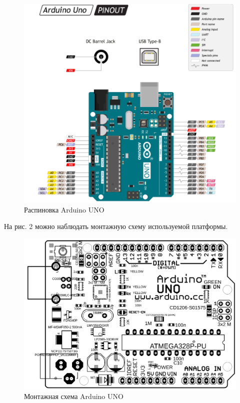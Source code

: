 \documentclass[a4paper, 12pt]{article}%
\begin{document}
\begin{figure}[h!]
\centering
\includegraphics[scale=0.6]{images/Arduino_UNO-pinout.png}
\caption{Распиновка Arduino UNO}
\label{Arduino_UNO-pinout}
\end{figure}

На рис. 2 можно наблюдать монтажную схему используемой платформы.

\begin{figure}[h!]
\centering
\includegraphics[scale=0.2]{images/arduino-uno-layout-top.png}
\caption{Монтажная схема Arduino UNO}
\label{arduino-uno-layout-top}
\end{figure}
\end{document}
